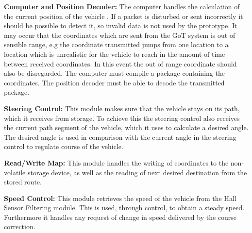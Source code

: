 \textbf{Computer and Position Decoder:}
The computer handles the calculation of the current position of the vehicle . If a packet is disturbed or sent incorrectly it should be possible to detect it, so invalid data is not used by the prototype. It may occur that the coordinates which are sent from the GoT system is out of sensible range, e.g the coordinate transmitted jumps from one location to a location which is unrealistic for the vehicle to reach in the amount of time between received coordinates. In this event the out of range coordinate should also be disregarded. The computer must compile a package containing the coordinates. The position decoder must be able to decode the transmitted package.


\textbf{Steering Control:}
This module makes sure that the vehicle stays on its path, which it receives from storage. To achieve this the steering control also receives the current path segment of the vehicle, which it uses to calculate a desired angle. The desired angle is used in comparison with the current angle in the steering control to regulate course of the vehicle.

\textbf{Read/Write Map:}
This module handles the writing of coordinates to the non-volatile storage device, as well as the reading of next desired destination from the stored route.

\textbf{Speed Control:}
This module retrieves the speed of the vehicle from the Hall Sensor Filtering module. This is used, through control, to obtain a steady speed. Furthermore it handles any request of change in speed delivered by the course correction.


